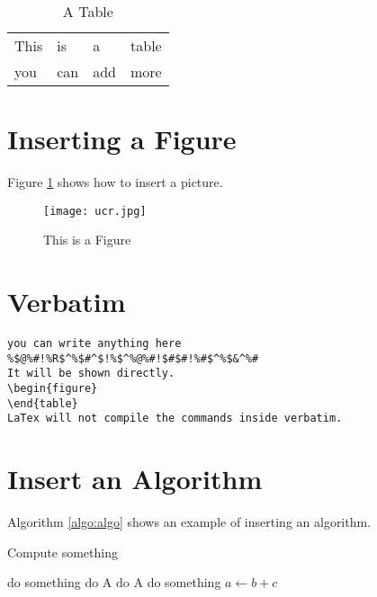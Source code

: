 \documentclass{article}[12pt]
\begin{document}
\begin{table}
  \centering
  \begin{tabular}{|l|l|l|l|}
    \hline
    This & is &a&table\\
    you  & can & add & more \\
    \hline
  \end{tabular}
  \caption{A Table}\label{tab:table}
\end{table}

\section{Inserting a Figure}

Figure \ref{fig:figure} shows how to insert a picture.

\begin{figure}
  \centering
  \texttt{[image: ucr.jpg]}
  \caption{This is a Figure}\label{fig:figure}
\end{figure}

\section{Verbatim}

\begin{verbatim}
you can write anything here
%$@%#!%R$^%$#^$!%$^%@%#!$#$#!%#$^%$&^%#
It will be shown directly.
\begin{figure}
\end{table}
LaTex will not compile the commands inside verbatim.
\end{verbatim}

\section{Insert an Algorithm}

Algorithm \ref{algo:algo} shows an example of inserting an algorithm.
 
\begin{algorithm}[H]
\caption{Compute something}\label{algo:algo}
do something
 {do A}
 {do A} %
do something 
$a\gets b+c$\\
\end{algorithm}
\end{document}
